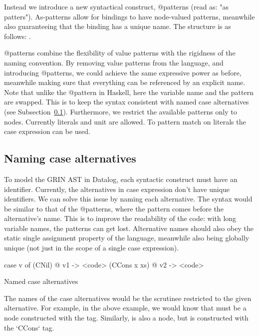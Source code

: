 \documentclass[main.tex]{subfiles}
\begin{document}
  Instead we introduce a new syntactical construct, @patterns (read as: "as patters"). As-patterns allow for bindings to have node-valued patterns, meanwhile also guaranteeing that the binding has a unique name. The structure is as follows: .

  @patterns combine the flexibility of value patterns with the rigidness of the naming convention. By removing value patterns from the language, and introducing @patterns, we could achieve the same expressive power as before, meanwhile making sure that everything can be referenced by an explicit name. Note that unlike the @pattern in Haskell, here the variable name and the pattern are swapped. This is to keep the syntax consistent with named case alternatives (see Subsection~\ref{subsec:named-alts}). Furthermore, we restrict the available patterns only to nodes. Currently literals and unit are allowed. To pattern match on literals the case expression can be used.

  \subsection{Naming case alternatives} \label{subsec:named-alts}

  To model the GRIN AST in Datalog, each syntactic construct must have an identifier. Currently, the alternatives in case expression don't have unique identifiers. We can solve this issue by naming each alternative. The syntax would be similar to that of the @patterns, where the pattern comes before the alternative's name. This is to improve the readability of the code: with long variable names, the patterns can get lost. Alternative names should also obey the static single assignment property of the language, meanwhile also being globally unique (not just in the scope of a single case expression).

  \hspace{-0.5cm}
  \begin{codeFloat}[h]
  	\centering
    \begin{minipage}{0.42\textwidth}
      \begin{haskell}
      case v of
        (CNil)       @ v1 -> <code>
        (CCons x xs) @ v2 -> <code>
      \end{haskell}
    \end{minipage}
  \caption{Named case alternatives}
  \label{code:named-alt}
  \end{codeFloat}

  The names of the case alternatives would be the scrutinee restricted to the given alternative. For example, in the above example, we would know that  must be a node constructed with the  tag. Similarly,  is also a node, but is constructed with the `CCons` tag.
\end{document}
